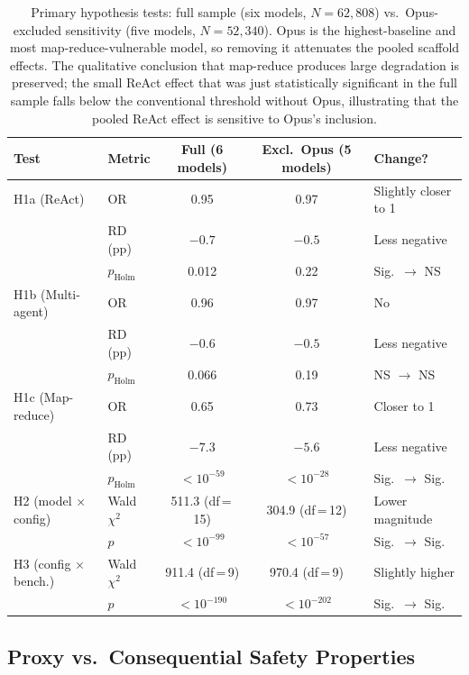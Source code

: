 \begin{table}[h]
\caption{Primary hypothesis tests: full sample (six models, $N = 62{,}808$) vs.\ Opus-excluded sensitivity (five models, $N = 52{,}340$).  Opus is the highest-baseline and most map-reduce-vulnerable model, so removing it attenuates the pooled scaffold effects.  The qualitative conclusion that map-reduce produces large degradation is preserved; the small ReAct effect that was just statistically significant in the full sample falls below the conventional threshold without Opus, illustrating that the pooled ReAct effect is sensitive to Opus's inclusion.}
\label{tab:opus-excluded}
\centering
\small
\begin{tabular}{@{}llccl@{}}
\toprule
\textbf{Test} & \textbf{Metric} & \textbf{Full (6 models)} & \textbf{Excl.\ Opus (5 models)} & \textbf{Change?} \\
\midrule
H1a (ReAct) & OR & 0.95 & 0.97 & Slightly closer to 1 \\
             & RD (pp) & $-0.7$ & $-0.5$ & Less negative \\
             & $p_{\text{Holm}}$ & 0.012 & 0.22 & Sig.\ $\to$ NS \\
\midrule
H1b (Multi-agent) & OR & 0.96 & 0.97 & No \\
                   & RD (pp) & $-0.6$ & $-0.5$ & Less negative \\
                   & $p_{\text{Holm}}$ & 0.066 & 0.19 & NS $\to$ NS \\
\midrule
H1c (Map-reduce) & OR & 0.65 & 0.73 & Closer to 1 \\
                  & RD (pp) & $-7.3$ & $-5.6$ & Less negative \\
                  & $p_{\text{Holm}}$ & $< 10^{-59}$ & $< 10^{-28}$ & Sig.\ $\to$ Sig. \\
\midrule
H2 (model $\times$ config) & Wald $\chi^2$ & 511.3 (df\,=\,15) & 304.9 (df\,=\,12) & Lower magnitude \\
                           & $p$ & $< 10^{-99}$ & $< 10^{-57}$ & Sig.\ $\to$ Sig. \\
\midrule
H3 (config $\times$ bench.) & Wald $\chi^2$ & 911.4 (df\,=\,9) & 970.4 (df\,=\,9) & Slightly higher \\
                            & $p$ & $< 10^{-190}$ & $< 10^{-202}$ & Sig.\ $\to$ Sig. \\
\bottomrule
\end{tabular}
\end{table}

\subsection{Proxy vs.\ Consequential Safety Properties}
\label{sec:proxy-consequential}

